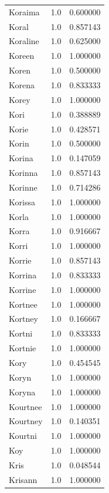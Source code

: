 \documentclass[
  letterpaper,
  DIV=11,
  numbers=noendperiod]{scrreprt}
\begin{document}
\begin{tabular}{lrr}
Koraima         &   1.0 &   0.600000 \\
Koral           &   1.0 &   0.857143 \\
Koraline        &   1.0 &   0.625000 \\
Koreen          &   1.0 &   1.000000 \\
Koren           &   1.0 &   0.500000 \\
Korena          &   1.0 &   0.833333 \\
Korey           &   1.0 &   1.000000 \\
Kori            &   1.0 &   0.388889 \\
Korie           &   1.0 &   0.428571 \\
Korin           &   1.0 &   0.500000 \\
Korina          &   1.0 &   0.147059 \\
Korinna         &   1.0 &   0.857143 \\
Korinne         &   1.0 &   0.714286 \\
Korissa         &   1.0 &   1.000000 \\
Korla           &   1.0 &   1.000000 \\
Korra           &   1.0 &   0.916667 \\
Korri           &   1.0 &   1.000000 \\
Korrie          &   1.0 &   0.857143 \\
Korrina         &   1.0 &   0.833333 \\
Korrine         &   1.0 &   1.000000 \\
Kortnee         &   1.0 &   1.000000 \\
Kortney         &   1.0 &   0.166667 \\
Kortni          &   1.0 &   0.833333 \\
Kortnie         &   1.0 &   1.000000 \\
Kory            &   1.0 &   0.454545 \\
Koryn           &   1.0 &   1.000000 \\
Koryna          &   1.0 &   1.000000 \\
Kourtnee        &   1.0 &   1.000000 \\
Kourtney        &   1.0 &   0.140351 \\
Kourtni         &   1.0 &   1.000000 \\
Koy             &   1.0 &   1.000000 \\
Kris            &   1.0 &   0.048544 \\
Krisann         &   1.0 &   1.000000 \\

\end{tabular}
\end{document}

